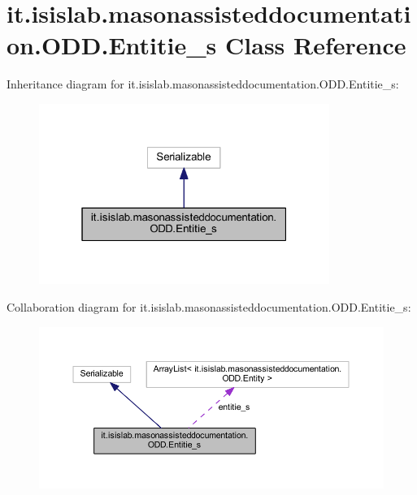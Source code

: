 \hypertarget{classit_1_1isislab_1_1masonassisteddocumentation_1_1_o_d_d_1_1_entitie__s}{\section{it.\-isislab.\-masonassisteddocumentation.\-O\-D\-D.\-Entitie\-\_\-s Class Reference}
\label{classit_1_1isislab_1_1masonassisteddocumentation_1_1_o_d_d_1_1_entitie__s}
}


Inheritance diagram for it.\-isislab.\-masonassisteddocumentation.\-O\-D\-D.\-Entitie\-\_\-s\-:\nopagebreak
\begin{figure}[H]
\begin{center}
\leavevmode
\includegraphics[width=268pt]{classit_1_1isislab_1_1masonassisteddocumentation_1_1_o_d_d_1_1_entitie__s__inherit__graph}
\end{center}
\end{figure}


Collaboration diagram for it.\-isislab.\-masonassisteddocumentation.\-O\-D\-D.\-Entitie\-\_\-s\-:\nopagebreak
\begin{figure}[H]
\begin{center}
\leavevmode
\includegraphics[width=350pt]{classit_1_1isislab_1_1masonassisteddocumentation_1_1_o_d_d_1_1_entitie__s__coll__graph}
\end{center}
\end{figure}
